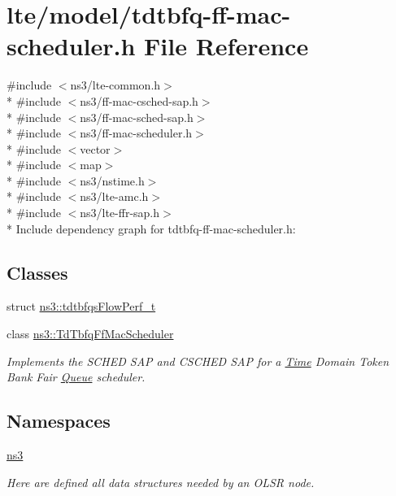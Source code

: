 \hypertarget{lte_2model_2tdtbfq-ff-mac-scheduler_8h}{}\section{lte/model/tdtbfq-\/ff-\/mac-\/scheduler.h File Reference}
\label{lte_2model_2tdtbfq-ff-mac-scheduler_8h}
{\ttfamily \#include $<$ns3/lte-\/common.\+h$>$}\\*
{\ttfamily \#include $<$ns3/ff-\/mac-\/csched-\/sap.\+h$>$}\\*
{\ttfamily \#include $<$ns3/ff-\/mac-\/sched-\/sap.\+h$>$}\\*
{\ttfamily \#include $<$ns3/ff-\/mac-\/scheduler.\+h$>$}\\*
{\ttfamily \#include $<$vector$>$}\\*
{\ttfamily \#include $<$map$>$}\\*
{\ttfamily \#include $<$ns3/nstime.\+h$>$}\\*
{\ttfamily \#include $<$ns3/lte-\/amc.\+h$>$}\\*
{\ttfamily \#include $<$ns3/lte-\/ffr-\/sap.\+h$>$}\\*
Include dependency graph for tdtbfq-\/ff-\/mac-\/scheduler.h\+:
\subsection*{Classes}
\begin{DoxyCompactItemize}
\item 
struct \hyperlink{structns3_1_1tdtbfqsFlowPerf__t}{ns3\+::tdtbfqs\+Flow\+Perf\+\_\+t}
\item 
class \hyperlink{classns3_1_1TdTbfqFfMacScheduler}{ns3\+::\+Td\+Tbfq\+Ff\+Mac\+Scheduler}
\begin{DoxyCompactList}\small\item\em Implements the S\+C\+H\+ED S\+AP and C\+S\+C\+H\+ED S\+AP for a \hyperlink{classns3_1_1Time}{Time} Domain Token Bank Fair \hyperlink{classns3_1_1Queue}{Queue} scheduler. \end{DoxyCompactList}\end{DoxyCompactItemize}
\subsection*{Namespaces}
\begin{DoxyCompactItemize}
\item 
 \hyperlink{namespacens3}{ns3}
\begin{DoxyCompactList}\small\item\em Here are defined all data structures needed by an O\+L\+SR node. \end{DoxyCompactList}\end{DoxyCompactItemize}
